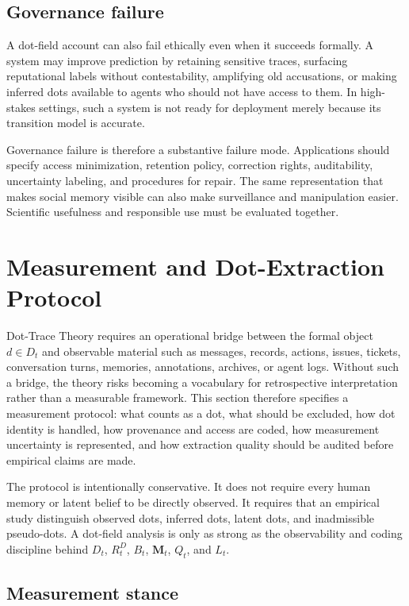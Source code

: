 \documentclass[11pt]{article}
\theoremstyle{remark}
\begin{document}
\subsection{Governance failure}\label{governance-failure}

A dot-field account can also fail ethically even when it succeeds formally. A system may improve prediction by retaining sensitive traces, surfacing reputational labels without contestability, amplifying old accusations, or making inferred dots available to agents who should not have access to them. In high-stakes settings, such a system is not ready for deployment merely because its transition model is accurate.

Governance failure is therefore a substantive failure mode. Applications should specify access minimization, retention policy, correction rights, auditability, uncertainty labeling, and procedures for repair. The same representation that makes social memory visible can also make surveillance and manipulation easier. Scientific usefulness and responsible use must be evaluated together.

\section{Measurement and Dot-Extraction Protocol}\label{measurement-dot-extraction-protocol}

Dot-Trace Theory requires an operational bridge between the formal object
\(d\in D_t\) and observable material such as messages, records, actions,
issues, tickets, conversation turns, memories, annotations, archives, or
agent logs. Without such a bridge, the theory risks becoming a vocabulary
for retrospective interpretation rather than a measurable framework. This
section therefore specifies a measurement protocol: what counts as a dot,
what should be excluded, how dot identity is handled, how provenance and
access are coded, how measurement uncertainty is represented, and how
extraction quality should be audited before empirical claims are made.

The protocol is intentionally conservative. It does not require every
human memory or latent belief to be directly observed. It requires that an
empirical study distinguish observed dots, inferred dots, latent dots, and
inadmissible pseudo-dots. A dot-field analysis is only as strong as the
observability and coding discipline behind \(D_t\), \(R_t^D\), \(B_t\),
\(\mathbf M_t\), \(Q_t\), and \(L_t\).

\subsection{Measurement stance}\label{measurement-stance}
\end{document}
